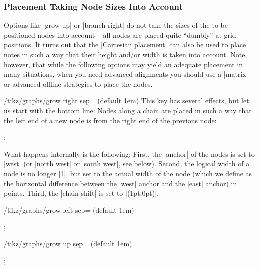 \subsubsection{Placement Taking Node Sizes Into Account}

Options like |grow up| or |branch right| do not take the sizes of the
to-be-positioned nodes into account -- all nodes are placed quite ``dumbly'' at
grid positions. It turns out that the |Cartesian placement| can also be used to
place notes in such a way that their height and/or width is taken into account.
Note, however, that while the following options may yield an adequate placement
in many situations, when you need advanced alignments you should use a |matrix|
or advanced offline strategies to place the nodes.

\begin{key}{/tikz/graphs/grow right sep= (default 1em)}
    This key has several effects, but let us start with the bottom line: Nodes
    along a chain are placed in such a way that the left end of a new node is
     from the right end of the previous node:
\begin{codeexample}[]
\tikz {};
\end{codeexample}
    What happens internally is the following: First, the |anchor| of the nodes
    is set to |west| (or |north west| or |south west|, see below). Second, the
    logical width of a node is no longer |1|, but set to the actual width of
    the node (which we define as the horizontal difference between the |west|
    anchor and the |east| anchor) in points. Third, the |chain shift| is set to
    |(1pt,0pt)|.
\end{key}

\begin{key}{/tikz/graphs/grow left sep= (default 1em)}
%
\begin{codeexample}[]
\tikz {};
\end{codeexample}
%
\end{key}

\begin{key}{/tikz/graphs/grow up sep= (default 1em)}
\begin{codeexample}[]
\tikz {};
\end{codeexample}
%
\end{key}

